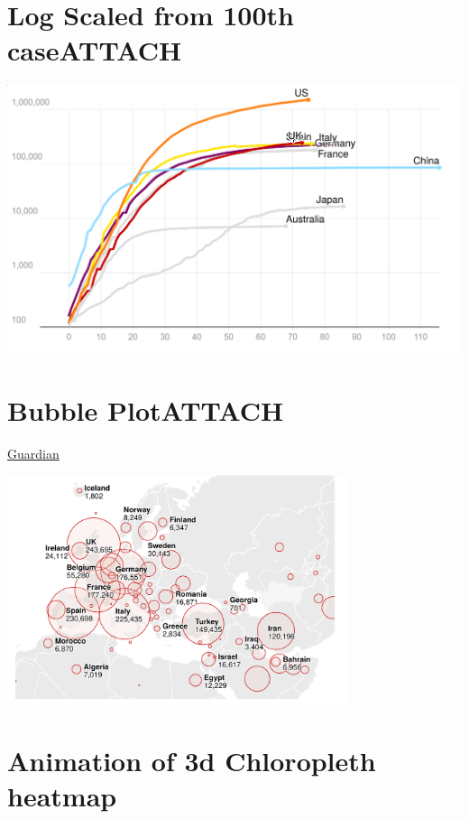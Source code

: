 \documentclass[11pt]{article}
\begin{document}
\section{Log Scaled from 100th case\hfill{}\textsc{ATTACH}}
\label{sec:orgb998fb8}
\begin{center}
\includegraphics[width=.9\linewidth]{./_20200518_184546screenshot.png}
\end{center}

\section{Bubble Plot\hfill{}\textsc{ATTACH}}
\label{sec:org03453be}
\href{https://www.theguardian.com/world/2020/may/18/coronavirus-world-map-which-countries-have-the-most-cases-and-deaths}{Guardian}


\begin{center}
\includegraphics[width=10cm]{./_20200518_184850screenshot.png}
\end{center}




\section{Animation of 3d Chloropleth heatmap}
\label{sec:org0f605b9}
\end{document}
